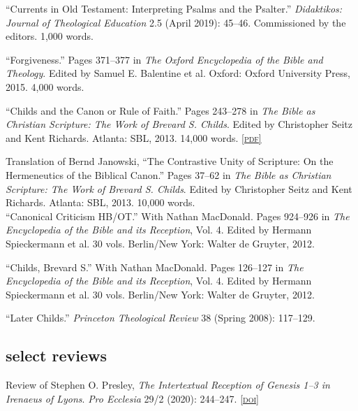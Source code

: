 \documentclass[11pt]{article}
\newcommand{\pdf}[1]{\href{#1}{\footnotesize\textsc{[pdf]}}}
\newcommand{\doi}[1]{\href{https://doi.org/#1}{\footnotesize\textsc{[doi]}}}
\newcommand{\years}[1]{\marginnote{\footnotesize #1}}
\begin{document}
\years{2019}
``Currents in Old Testament: Interpreting Psalms and the Psalter.''
\emph{Didaktikos: Journal of Theological Education} 2.5 (April 2019):
45–46. Commissioned by the editors. 1,000 words.

\years{2015}
``Forgiveness.'' Pages 371--377 in \emph{The Oxford Encyclopedia of the
Bible and Theology}. Edited by Samuel E. Balentine et al. Oxford: Oxford
University Press, 2015. 4,000 words.

\years{2013}
``Childs and the Canon or Rule of Faith.'' Pages 243--278 in \emph{The
Bible as Christian Scripture: The Work of Brevard S. Childs}. Edited by
Christopher Seitz and Kent Richards. Atlanta: SBL, 2013. 14,000 words.
\pdf{http://danieldriver.com/assets/pdf/publications/Driver_2013.pdf}

\years{2013}
Translation of Bernd Janowski, ``The Contrastive Unity of Scripture: On
the Hermeneutics of the Biblical Canon.'' Pages 37--62 in \emph{The
Bible as Christian Scripture: The Work of Brevard S. Childs}. Edited by
Christopher Seitz and Kent Richards. Atlanta: SBL, 2013. 10,000 words.
\\%

\years{2012}
``Canonical Criticism HB/OT.'' With Nathan MacDonald. Pages 924–926 in
\emph{The Encyclopedia of the Bible and its Reception}, Vol. 4. Edited
by Hermann Spieckermann et al. 30 vols. Berlin/New York: Walter de
Gruyter, 2012.

\years{2012}
``Childs, Brevard S.'' With Nathan MacDonald. Pages 126–127 in \emph{The
Encyclopedia of the Bible and its Reception}, Vol. 4. Edited by Hermann
Spieckermann et al. 30 vols. Berlin/New York: Walter de Gruyter, 2012.

\years{2008}
``Later Childs.'' \emph{Princeton Theological Review} 38 (Spring 2008):
117--129.


\subsection*{select reviews}

\years{2020}
Review of Stephen O. Presley, \emph{The Intertextual Reception of
Genesis 1–3 in Irenaeus of Lyons}. \emph{Pro Ecclesia} 29/2 (2020):
244--247.
\doi{10.1177/1063851220907982}
\end{document}

